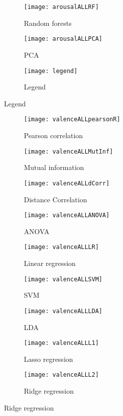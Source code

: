 \begin{figure}[!tbp]
  \begin{subfigure}[b]{0.3\textwidth}
    \texttt{[image: arousalALLRF]}
    \caption{Random forests}
  \end{subfigure}
  \hfill
  \begin{subfigure}[b]{0.3\textwidth}
    \texttt{[image: arousalALLPCA]} %
    \caption{PCA}
  \end{subfigure}
  \hfill
  \begin{subfigure}[b]{0.3\textwidth}
    \texttt{[image: legend]}
    \caption{Legend\label{arousalpieslegend}}
  \end{subfigure}
\end{figure}

\clearpage

\begin{figure}[!tbp]
  \centering
  \caption{Selection features for valence classification.\label{valencepies}}
  \begin{subfigure}[b]{0.3\textwidth}
    \texttt{[image: valenceALLpearsonR]}
    \caption{Pearson correlation}
  \end{subfigure}
  \hfill
  \begin{subfigure}[b]{0.3\textwidth}
    \texttt{[image: valenceALLMutInf]}
    \caption{Mutual information}
  \end{subfigure}
  \hfill
  \begin{subfigure}[b]{0.3\textwidth}
    \texttt{[image: valenceALLdCorr]}
    \caption{Distance Correlation}
  \end{subfigure}
  
  \begin{subfigure}[b]{0.3\textwidth}
    \texttt{[image: valenceALLANOVA]}
    \caption{ANOVA}
  \end{subfigure}
  \hfill
  \begin{subfigure}[b]{0.3\textwidth}
    \texttt{[image: valenceALLLR]}
    \caption{Linear regression}
  \end{subfigure}
  \hfill
  \begin{subfigure}[b]{0.3\textwidth}
    \texttt{[image: valenceALLSVM]}
    \caption{SVM}
  \end{subfigure}
  
  \begin{subfigure}[b]{0.3\textwidth}
    \texttt{[image: valenceALLLDA]}
    \caption{LDA}
  \end{subfigure}
  \hfill
  \begin{subfigure}[b]{0.3\textwidth}
    \texttt{[image: valenceALLL1]}
    \caption{Lasso regression}
  \end{subfigure}
  \hfill
  \begin{subfigure}[b]{0.3\textwidth}
    \texttt{[image: valenceALLL2]}
    \caption{Ridge regression}
  \end{subfigure}
  

\end{figure}
